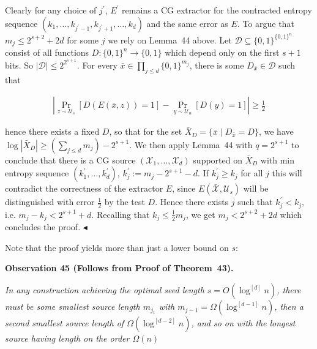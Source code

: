 Clearly for any choice of $j^{\prime}$, $E^{\prime}$ remains a CG extractor for the contracted entropy sequence $(k_{1},\ldots,k_{j^{\prime}-1},k_{j^{\prime}+1},\ldots,k_{d})$ and the same error as $E$.
To argue that $m_{j}\leq 2^{s+2}+2d$ for some $j$ we rely on Lemma 44 above. Let $\mathcal{D}\subseteq\{0,1\}^{\{0,1\}^{n}}$ consist of all functions $D:\{0,1\}^{n}\to\{0,1\}$ which depend only on the first $s+1$ bits. So $|\mathcal{D}|\leq 2^{2^{s+1}}$. For every $\bar{x}\in\prod_{j\leq d}\{0,1\}^{m_{j}}$, there is some $D_{\bar{x}}\in\mathcal{D}$ such that\par


\[\begin{gathered}
|\Pr_{z\sim\mathcal{U}_{s}}[D(E(\bar{x},z))=1]-\Pr_{y\sim\mathcal{U}_{n}}[D(y)=1]|\geq\frac{1}{2}
\end{gathered}\]


hence there exists a fixed $D$, so that for the set $\bar{X}_{D}=\{\bar{x}\mid D_{\bar{x}}=D\}$,
we have $\log|\bar{X}_{D}|\geq(\sum_{j\leq d}m_{j})-2^{s+1}$. We then apply Lemma 44 with $q=2^{s+1}$ to conclude that there is a CG source $(\mathcal{X}_{1},\ldots,\mathcal{X}_{d})$ supported on $\bar{X}_{D}$ with min entropy sequence $(k^{\prime}_{1},\ldots,k^{\prime}_{d})$, $k^{\prime}_{j}:=m_{j}-2^{s+1}-d$. If $k^{\prime}_{j}\geq k_{j}$ for all $j$ this will contradict the correctness of the extractor $E$, since $E(\bar{\mathcal{X}},\mathcal{U}_{s})$ will be distinguished with error $\frac{1}{2}$ by the test $D$. Hence there exists $j$ such that $k^{\prime}_{j}<k_{j}$, i.e. $m_{j}-k_{j}<2^{s+1}+d$. Recalling that $k_{j}\leq\frac{1}{2}m_{j}$, we get $m_{j}<2^{s+2}+2d$ which concludes the proof.
$\blacktriangleleft$\par




Note that the proof yields more than just a lower bound on $s$:\par





\par\medskip\noindent\textbf{
\textbf{Observation 45}\textbf{ }(Follows from Proof of Theorem 43)\textbf{.}
}\par



\emph{In any construction achieving the optimal seed length $s=O(\log^{[d]}n)$, there must be some smallest source length $m_{j_{1}}$ with $m_{j-1}=\Omega(\log^{[d-1]}n)$, then a second smallest source length of $\Omega(\log^{[d-2]}n)$, and so on with the longest source having length on the order $\Omega(n)$}\par



